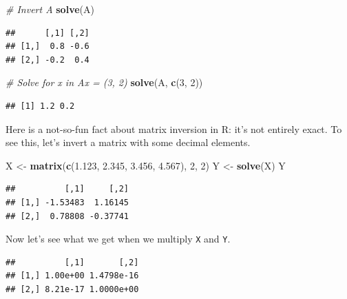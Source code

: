 \documentclass[12pt,oneside,openany]{book}
\newenvironment{Shaded}{\begin{snugshade}}{\end{snugshade}}
\newcommand{\KeywordTok}[1]{\textcolor[rgb]{0.13,0.29,0.53}{\textbf{#1}}}
\newcommand{\DecValTok}[1]{\textcolor[rgb]{0.00,0.00,0.81}{#1}}
\newcommand{\FloatTok}[1]{\textcolor[rgb]{0.00,0.00,0.81}{#1}}
\newcommand{\StringTok}[1]{\textcolor[rgb]{0.31,0.60,0.02}{#1}}
\newcommand{\CommentTok}[1]{\textcolor[rgb]{0.56,0.35,0.01}{\textit{#1}}}
\newcommand{\OperatorTok}[1]{\textcolor[rgb]{0.81,0.36,0.00}{\textbf{#1}}}
\newcommand{\NormalTok}[1]{#1}
\begin{document}
\begin{Shaded}
\begin{Highlighting}[]
\CommentTok{# Invert A}
\KeywordTok{solve}\NormalTok{(A)}
\end{Highlighting}
\end{Shaded}

\begin{verbatim}
##      [,1] [,2]
## [1,]  0.8 -0.6
## [2,] -0.2  0.4
\end{verbatim}

\begin{Shaded}
\begin{Highlighting}[]
\CommentTok{# Solve for x in Ax = (3, 2)}
\KeywordTok{solve}\NormalTok{(A, }\KeywordTok{c}\NormalTok{(}\DecValTok{3}\NormalTok{, }\DecValTok{2}\NormalTok{))}
\end{Highlighting}
\end{Shaded}

\begin{verbatim}
## [1] 1.2 0.2
\end{verbatim}

Here is a not-so-fun fact about matrix inversion in R: it's not entirely
exact. To see this, let's invert a matrix with some decimal elements.

\begin{Shaded}
\begin{Highlighting}[]
\NormalTok{X <-}\StringTok{ }\KeywordTok{matrix}\NormalTok{(}\KeywordTok{c}\NormalTok{(}\FloatTok{1.123}\NormalTok{, }\FloatTok{2.345}\NormalTok{, }\FloatTok{3.456}\NormalTok{, }\FloatTok{4.567}\NormalTok{), }\DecValTok{2}\NormalTok{, }\DecValTok{2}\NormalTok{)}
\NormalTok{Y <-}\StringTok{ }\KeywordTok{solve}\NormalTok{(X)}
\NormalTok{Y}
\end{Highlighting}
\end{Shaded}

\begin{verbatim}
##          [,1]     [,2]
## [1,] -1.53483  1.16145
## [2,]  0.78808 -0.37741
\end{verbatim}

Now let's see what we get when we multiply \texttt{X} and \texttt{Y}.

\begin{Shaded}
\end{Shaded}

\begin{verbatim}
##          [,1]       [,2]
## [1,] 1.00e+00 1.4798e-16
## [2,] 8.21e-17 1.0000e+00
\end{verbatim}
\end{document}
